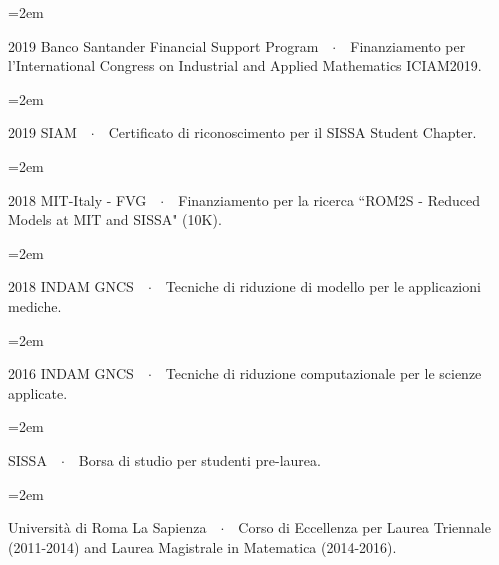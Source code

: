 \documentclass[
  usegeometry%
]{scrartcl}
\newcommand{\Description}[1]{\hangindent=2em\hangafter=0\noindent\raggedright\footnotesize{#1}\par\normalsize\vspace{1em}} %
\begin{document}
\begin{cv}{}
\vspace{-0.5em} %

\Description{{\color{violet}2019 Banco Santander Financial Support Program}\ \ $\cdotp$\ \   Finanziamento per l'International Congress on Industrial and Applied Mathematics ICIAM2019.}

\vspace{-0.5em} %

\Description{{\color{violet}2019 SIAM}\ \ $\cdotp$\ \  Certificato di riconoscimento per il SISSA Student Chapter.}

\vspace{-0.5em} %

\Description{{\color{violet}2018 MIT-Italy - FVG}\ \ $\cdotp$\ \  Finanziamento per la ricerca ``ROM2S - Reduced Models at MIT and SISSA" (10K).}

\vspace{-0.5em} %

\Description{{\color{violet}2018 INDAM GNCS}\ \ $\cdotp$\ \  Tecniche di riduzione di modello per le applicazioni mediche.}

\vspace{-0.5em} %
%
\Description{{\color{violet}2016 INDAM GNCS}\ \ $\cdotp$\ \  Tecniche di riduzione computazionale per le scienze applicate.}

\vspace{-0.5em} %

\Description{{\color{violet}SISSA}\ \ $\cdotp$\ \ Borsa di studio per studenti pre-laurea.}

\vspace{-0.5em} %

\Description{{\color{violet}Università di Roma La Sapienza}\ \ $\cdotp$\ \ Corso di Eccellenza per Laurea Triennale (2011-2014) and Laurea Magistrale in Matematica (2014-2016).}



\end{cv}
\end{document}
